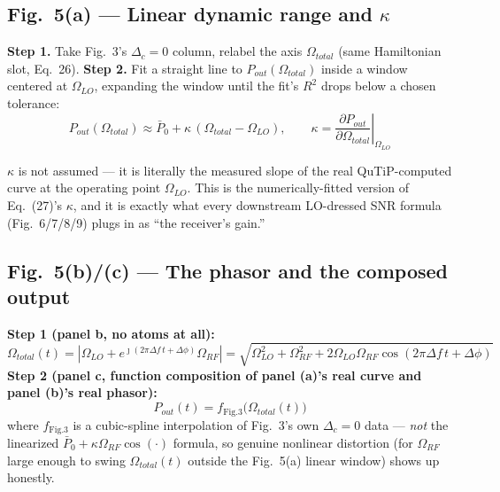 \documentclass[11pt]{article}
\begin{document}
\subsection*{Fig.~5(a) --- Linear dynamic range and $\kappa$}
\textbf{Step 1.} Take Fig.~3's $\Delta_c=0$ column, relabel the axis $\Omega_{total}$ (same Hamiltonian slot, Eq.~26).
\textbf{Step 2.} Fit a straight line to $P_{out}(\Omega_{total})$ inside a window centered at $\Omega_{LO}$, expanding the window until the fit's $R^2$ drops below a chosen tolerance:
\[
P_{out}(\Omega_{total}) \approx \bar P_0 + \kappa\,(\Omega_{total}-\Omega_{LO}), \qquad \kappa = \left.\frac{\partial P_{out}}{\partial\Omega_{total}}\right|_{\Omega_{LO}}
\]
\begin{eqmeaning}
$\kappa$ is not assumed --- it is literally the measured slope of the real QuTiP-computed curve at the operating point $\Omega_{LO}$. This is the numerically-fitted version of Eq.~(27)'s $\kappa$, and it is exactly what every downstream LO-dressed SNR formula (Fig.~6/7/8/9) plugs in as ``the receiver's gain.''
\end{eqmeaning}
\begin{center}
\end{center}

\subsection*{Fig.~5(b)/(c) --- The phasor and the composed output}
\textbf{Step 1 (panel b, no atoms at all):}
\[
\boxed{\Omega_{total}(t) = \left|\Omega_{LO}+e^{\jmath(2\pi\Delta f\,t+\Delta\phi)}\Omega_{RF}\right| = \sqrt{\Omega_{LO}^2+\Omega_{RF}^2+2\Omega_{LO}\Omega_{RF}\cos(2\pi\Delta f\,t+\Delta\phi)}}
\]
\textbf{Step 2 (panel c, function composition of panel (a)'s real curve and panel (b)'s real phasor):}
\[
\boxed{P_{out}(t) = f_{\text{Fig.3}}\big(\Omega_{total}(t)\big)}
\]
where $f_{\text{Fig.3}}$ is a cubic-spline interpolation of Fig.~3's own $\Delta_c=0$ data --- \emph{not} the linearized $\bar P_0+\kappa\Omega_{RF}\cos(\cdot)$ formula, so genuine nonlinear distortion (for $\Omega_{RF}$ large enough to swing $\Omega_{total}(t)$ outside the Fig.~5(a) linear window) shows up honestly.
\begin{center}
\end{center}
\end{document}
